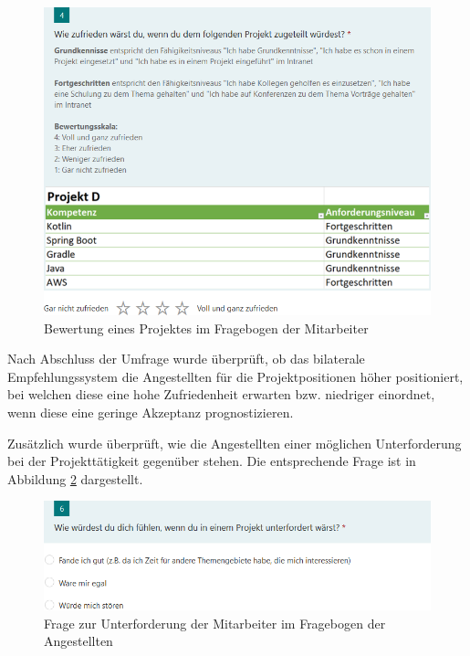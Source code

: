 \begin{figure}[h]
	\centering
	\includegraphics[width=1\textwidth]{gfx/projekt-umfrage.png}
	\caption{Bewertung eines Projektes im Fragebogen der Mitarbeiter}
	\label{fig:methodik:evaluation:abb1}
\end{figure}

Nach Abschluss der Umfrage wurde überprüft, ob das bilaterale Empfehlungssystem die Angestellten für die Projektpositionen höher positioniert, bei welchen diese eine hohe Zufriedenheit erwarten bzw. niedriger einordnet, wenn diese eine geringe Akzeptanz prognostizieren.

Zusätzlich wurde überprüft, wie die Angestellten einer möglichen Unterforderung bei der Projekttätigkeit gegenüber stehen. Die entsprechende Frage ist in Abbildung \ref{fig:methodik:evaluation:abb3} dargestellt.

\begin{figure}[h]
	\centering
	\includegraphics[width=1\textwidth]{gfx/umfrage-mitarbeiter-unterforderung.png}
	\caption{Frage zur Unterforderung der Mitarbeiter im Fragebogen der Angestellten}
	\label{fig:methodik:evaluation:abb3}
\end{figure}

